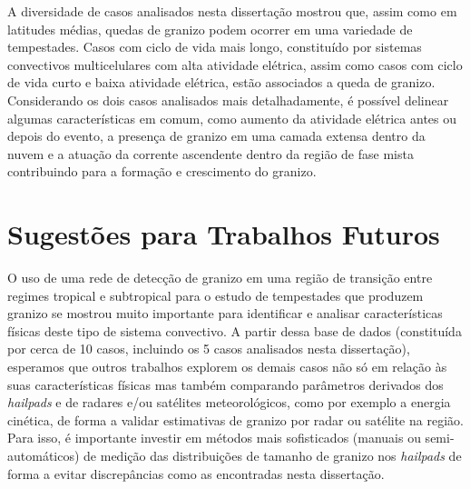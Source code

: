 A diversidade de casos analisados nesta dissertação mostrou que, assim como em latitudes médias, quedas de granizo podem ocorrer em uma variedade de tempestades. Casos com ciclo de vida mais longo, constituído por sistemas convectivos multicelulares com alta atividade elétrica, assim como casos com ciclo de vida curto e baixa atividade elétrica, estão associados a queda de granizo. Considerando os dois casos analisados mais detalhadamente, é possível delinear algumas características em comum, como aumento da atividade elétrica antes ou depois do evento, a presença de granizo em uma camada extensa dentro da nuvem e a atuação da corrente ascendente dentro da região de fase mista contribuindo para a formação e crescimento do granizo.

\section{Sugestões para Trabalhos Futuros}\label{sugestoes}

O uso de uma rede de detecção de granizo em uma região de transição entre regimes tropical e subtropical para o estudo de tempestades que produzem granizo se mostrou muito importante para identificar e analisar características físicas deste tipo de sistema convectivo. A partir dessa base de dados (constituída por cerca de 10 casos, incluindo os 5 casos analisados nesta dissertação), esperamos que outros trabalhos explorem os demais casos não só em relação às suas características físicas mas também comparando 
parâmetros derivados dos \textit{hailpads} e de radares e/ou satélites meteorológicos, como por exemplo a energia cinética, de forma a validar estimativas de granizo por radar ou satélite na região. Para isso, é importante investir em métodos mais sofisticados (manuais ou semi-automáticos) de medição das distribuições de tamanho de granizo nos \textit{hailpads} de forma a evitar discrepâncias como as encontradas nesta dissertação.

